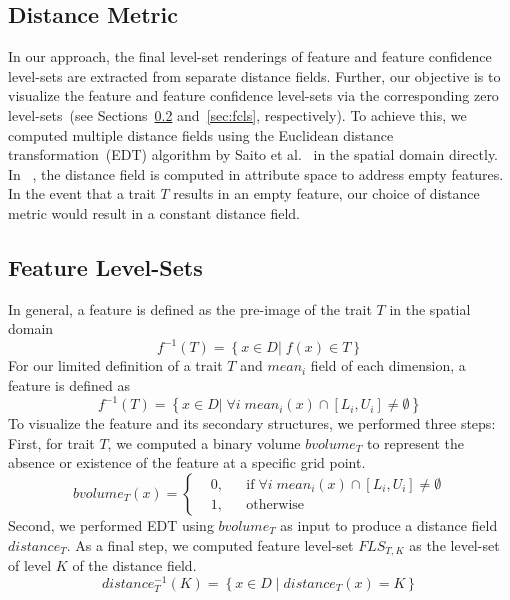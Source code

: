 \vspace{-2mm}
\subsection{Distance Metric}
%

In our approach, the final level-set renderings of feature and feature confidence level-sets are extracted from separate distance fields.
%
Further, our objective is to visualize the feature and feature confidence level-sets via the corresponding zero level-sets~(see Sections~\ref{sec:fls} and~\ref{sec:fcls}, respectively). 
%
To achieve this, we computed multiple distance fields using the Euclidean distance transformation~(EDT) algorithm by Saito et al.~\cite{saito1994new} in the spatial domain directly.
%
In ~\cite{jankowai2020feature}, the distance field is computed in attribute space to address empty features.
%
In the event that a trait $T$ results in an empty feature, our choice of distance metric would result in a constant distance field. 

\vspace{-2mm}
\subsection{Feature Level-Sets}
\label{sec:fls}
In general, a feature is defined as the pre-image of the trait $T$ in the spatial domain
\begin{equation}
f^{-1}(T) = \left\{ x \in D |\; f(x) \in T \right\}
\end{equation}
%
For our limited definition of a trait $T$ and $mean_{i}$ field of each dimension, a feature is defined as 
\begin{equation}
f^{-1}(T) = \left\{ x \in D |\; \forall i\;mean_{i}(x) \cap [L_{i}, U_{i}] \neq \emptyset\right\}
\end{equation}
To visualize the feature and its secondary structures, we performed three steps:
%
First, for trait $T$, we computed a binary volume $bvolume_{T}$ to represent the absence or existence of the feature at a specific grid point.
%
\begin{equation}
  bvolume_{T}(x) = \left \{
  \begin{aligned}
    &0, && \text{if}\; \forall i\; mean_{i}(x) \cap [L_{i}, U_{i}] \neq \emptyset \\
    &1, && \text{otherwise}
  \end{aligned} \right.
\end{equation}
%
Second, we performed EDT using $bvolume_{T}$ as input to produce a distance field $distance_{T}$. 
%
%
As a final step, we computed feature level-set $FLS_{T,K}$ as the level-set of level $K$ of the distance field.
%
\begin{equation} 
distance_{T}^{-1}(K) = \left\{ x \in D\; |\; distance_{T}(x) = K\right\}
\end{equation}

